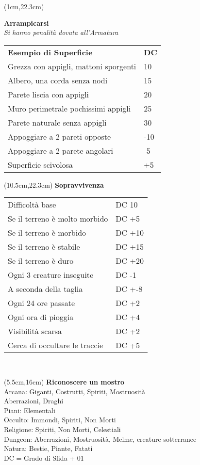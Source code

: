 \documentclass[a4paper,12 pt,openany]{book}
\begin{document}
\begin{textblock*}{9cm}(1cm,22.3cm) %

\textbf{Arrampicarsi}\\
\textit{Si hanno penalità dovuta all'Armatura}

\begin{tabular}{ll}
	\textbf{Esempio di Superficie} & \textbf{DC}\\
	Grezza con appigli, mattoni sporgenti&10\\
	Albero, una corda senza nodi&15\\
	Parete liscia con appigli &20\\
	Muro perimetrale pochissimi appigli&25\\
	Parete naturale senza appigli&30\\
	Appoggiare a 2 pareti opposte&-10\\
	Appoggiare a 2 parete angolari&-5\\
	Superficie scivolosa&+5\\
\end{tabular}

\end{textblock*}


	\begin{textblock*}{8cm}(10.5cm,22.3cm) %
\textbf{Sopravvivenza}
\begin{tabular}{ll}
	Difficoltà base  & DC 10\\
	Se il terreno è molto morbido& DC +5\\
	Se il terreno è morbido& DC +10\\
	Se il terreno è stabile& DC +15\\
	Se il terreno è duro& DC +20\\
	Ogni 3 creature inseguite& DC -1\\
	A seconda della taglia& DC +-8\\
	Ogni 24 ore passate&DC +2\\
	Ogni ora di pioggia&DC +4\\
	Visibilità scarsa&DC +2\\
	Cerca di occultare le traccie&DC +5\\
\end{tabular}\\
\end{textblock*}


\begin{textblock*}{7cm}(5.5cm,16cm) %
	\textbf{Riconoscere un mostro}\\
	Arcana: Giganti, Costrutti, Spiriti, Mostruosità\\
	Aberrazioni, Draghi\\
	Piani: Elementali\\
	Occulto: Immondi, Spiriti, Non Morti\\
	Religione: Spiriti, Non Morti, Celestiali\\
	Dungeon: Aberrazioni, Mostruosità, Melme, creature sotterranee\\
	Natura: Bestie, Piante, Fatati\\
	DC = Grado di Sfida + 01
\end{textblock*}
\end{document}
